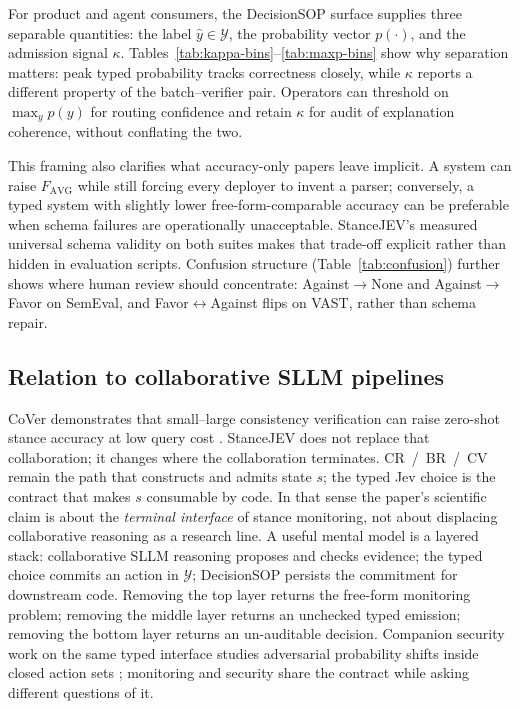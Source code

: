 \documentclass[10pt]{article}
\theoremstyle{definition}
\begin{document}
For product and agent consumers, the DecisionSOP surface supplies three separable quantities:
the label $\hat{y}\in\mathcal{Y}$, the probability vector $p(\cdot)$, and the admission signal $\kappa$.
Tables~\ref{tab:kappa-bins}--\ref{tab:maxp-bins} show why separation matters: peak typed probability tracks
correctness closely, while $\kappa$ reports a different property of the batch--verifier pair.
Operators can threshold on $\max_y p(y)$ for routing confidence and retain $\kappa$ for audit of explanation
coherence, without conflating the two.

This framing also clarifies what accuracy-only papers leave implicit.
A system can raise $F_{\mathrm{AVG}}$ while still forcing every deployer to invent a parser; conversely, a typed
system with slightly lower free-form-comparable accuracy can be preferable when schema failures are
operationally unacceptable.
StanceJEV's measured universal schema validity on both suites makes that trade-off explicit rather than
hidden in evaluation scripts.
Confusion structure (Table~\ref{tab:confusion}) further shows where human review should concentrate:
Against$\rightarrow$None and Against$\rightarrow$Favor on SemEval, and Favor$\leftrightarrow$Against flips on
VAST, rather than schema repair.

\subsection{Relation to collaborative SLLM pipelines}
CoVer demonstrates that small--large consistency verification can raise zero-shot stance accuracy at low query
cost \cite{yan2025cover}.
StanceJEV does not replace that collaboration; it changes where the collaboration terminates.
CR~/~BR~/~CV remain the path that constructs and admits state $s$; the typed Jev choice is the contract that
makes $s$ consumable by code.
In that sense the paper's scientific claim is about the \emph{terminal interface} of stance monitoring, not
about displacing collaborative reasoning as a research line.
A useful mental model is a layered stack: collaborative SLLM reasoning proposes and checks evidence; the typed
choice commits an action in $\mathcal{Y}$; DecisionSOP persists the commitment for downstream code.
Removing the top layer returns the free-form monitoring problem; removing the middle layer returns an unchecked
typed emission; removing the bottom layer returns an un-auditable decision.
Companion security work on the same typed interface studies adversarial probability shifts inside closed
action sets \cite{wu2026decisionhijacking,yan2025benign,yan2026searchattack}; monitoring and security share
the contract while asking different questions of it.
\end{document}

